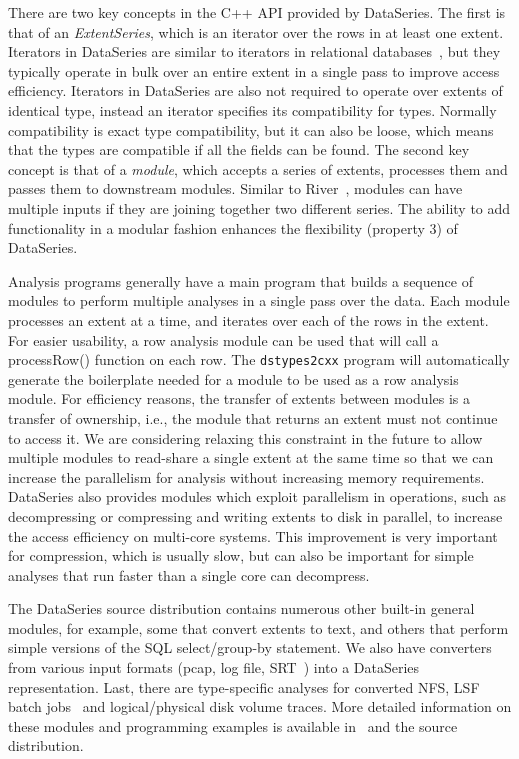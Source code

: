 \documentclass{acm_proc_article-sp}
\begin{document}
There are two key concepts in the C++ API provided by
DataSeries. The first is that of an \textit{ExtentSeries}, which is an
iterator over the rows in at least one extent.  Iterators in
DataSeries are similar to iterators in relational
databases~\cite{graefeQueryProcessing93}, but they typically operate
in bulk over an entire extent in a single pass to improve access
efficiency.  Iterators in DataSeries 
are also not required to operate
over extents of identical type, instead an iterator specifies its
compatibility for types.  Normally compatibility is exact type
compatibility, but it can also be loose, which means that the types
are compatible if all the fields can be found.  The second key concept
is that of a \textit{module}, which accepts a series of extents,
processes them and passes them to downstream modules.  Similar to
River~\cite{river99}, modules can have multiple inputs if they are
joining together two different series.  The ability to add
functionality in a modular fashion enhances the flexibility (property
3) of DataSeries.  


Analysis programs generally have a main program that builds a sequence
of modules to perform multiple analyses in a single pass over the
data. Each module processes an extent at a time, and iterates over
each of the rows in the extent.  For easier usability, a row analysis
module can be used that will call a processRow() function on each row.
The {\tt dstypes2cxx} program will automatically generate the boilerplate
needed for a module to be used as a row analysis module.
For efficiency reasons, the transfer of extents between
modules is a transfer of ownership, i.e., the module that returns an
extent must not continue to access it. We are considering relaxing
this constraint in the future to allow multiple modules to read-share
a single extent at the same time so that we can increase the 
parallelism for analysis without increasing memory requirements.
DataSeries also provides modules which exploit parallelism in
operations, such as decompressing or compressing and writing extents
to disk in parallel, 
to increase the access efficiency on
multi-core systems.  This improvement is very important for
compression, which is usually slow, but can also be important for
simple analyses that run faster than a single core can decompress.

The DataSeries source distribution contains numerous other built-in
general modules, for example, some that convert extents to text, and
others that perform simple versions of the SQL select/group-by
statement.  We also have converters from various input formats (pcap,
log file, SRT~\cite{SRT}) into a DataSeries representation. 
Last, there are type-specific analyses for converted NFS, LSF batch
jobs~\cite{PlatformLSF} and logical/physical disk volume traces.  More
detailed information on these modules and programming examples is
available 
in~\cite{DSTechnicalReportSnapshot} and the source distribution.
\end{document}
